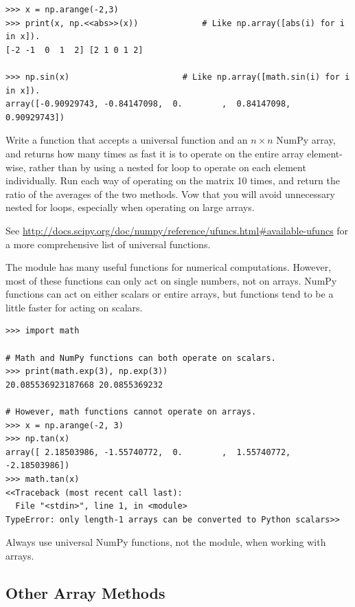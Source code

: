 \begin{lstlisting}
>>> x = np.arange(-2,3)
>>> print(x, np.<<abs>>(x))             # Like np.array([abs(i) for i in x]).
[-2 -1  0  1  2] [2 1 0 1 2]

>>> np.sin(x)                       # Like np.array([math.sin(i) for i in x]).
array([-0.90929743, -0.84147098,  0.        ,  0.84147098,  0.90929743])
\end{lstlisting}

\begin{problem}
Write a function that accepts a universal function and an $n\times n$ NumPy array, and returns how many times as fast it is to operate on the entire array element-wise, rather than by using a nested for loop to operate on each element individually. 
Run each way of operating on the matrix 10 times, and return the ratio of the averages of the two methods. 
Vow that you will avoid unnecessary nested for loops, especially when operating on large arrays.
\end{problem}

See \url{http://docs.scipy.org/doc/numpy/reference/ufuncs.html#available-ufuncs} for a more comprehensive list of universal functions.

\begin{warn}
The  module has many useful functions for numerical computations.
However, most of these functions can only act on single numbers, not on arrays.
NumPy functions can act on either scalars or entire arrays, but  functions tend to be a little faster for acting on scalars.
\begin{lstlisting}
>>> import math

# Math and NumPy functions can both operate on scalars.
>>> print(math.exp(3), np.exp(3))
20.085536923187668 20.0855369232

# However, math functions cannot operate on arrays.
>>> x = np.arange(-2, 3)
>>> np.tan(x)
array([ 2.18503986, -1.55740772,  0.        ,  1.55740772, -2.18503986])
>>> math.tan(x)
<<Traceback (most recent call last):
  File "<stdin>", line 1, in <module>
TypeError: only length-1 arrays can be converted to Python scalars>>
\end{lstlisting}
Always use universal NumPy functions, not the  module, when working with arrays.
\end{warn}

\subsection*{Other Array Methods} %

